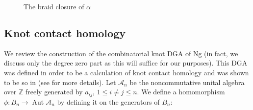 \documentclass[11pt]{amsart}
\def\Z{{\mathbb Z}}
\def\A{{\mathcal A}}
\newcommand\Aut{\operatorname{Aut}}
\theoremstyle{definition}
\begin{document}
    \begin{figure}[ht]
      \caption{The braid closure of $\alpha$}
      \label{fig:BClosure}
    \end{figure}

\subsection{Knot contact homology}
\label{SecBG_KCHdef}

  We review the construction of the combinatorial knot DGA of Ng (in fact, we discuss only the degree zero part as this will suffice for our purposes). This DGA was defined in order to be a calculation of knot contact homology and was shown to be so in \cite{EENS12} (see \cite{Ng12} for more details). Let $\A_n$ be the noncommutative unital algebra over $\Z$ freely generated by $a_{ij}$, $1\le i\ne j\le n$. We define a homomorphism $\phi : B_n \rightarrow\Aut \A_n$ by defining it on the generators of $B_n$:
\end{document}
